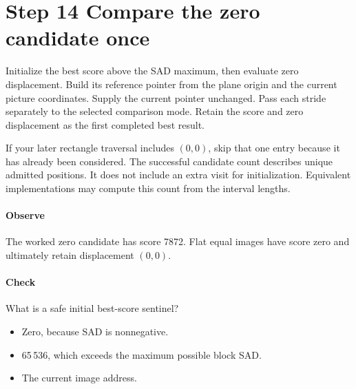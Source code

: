 \section{Step 14 Compare the zero candidate once}\label{h263-motion-s04}
Initialize the best score above the SAD maximum, then evaluate zero displacement.
Build its reference pointer from the plane origin and the current picture
coordinates. Supply the current pointer unchanged. Pass each stride separately
to the selected comparison mode. Retain the score and zero displacement as the
first completed best result.

If your later rectangle traversal includes $(0,0)$, skip that one entry because
it has already been considered. The successful candidate count describes unique
admitted positions. It does not include an extra visit for initialization.
Equivalent implementations may compute this count from the interval lengths.

\paragraph{Observe} The worked zero candidate has score 7872. Flat equal images
have score zero and ultimately retain displacement $(0,0)$.
\paragraph{Check} What is a safe initial best-score sentinel?
\begin{itemize}
  \item[A.] Zero, because SAD is nonnegative.
  \item[B.] 65\,536, which exceeds the maximum possible block SAD.
  \item[C.] The current image address.
\end{itemize}
